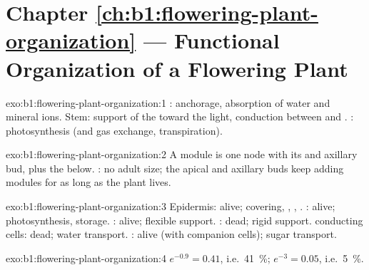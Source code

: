\section*{Chapter \ref{ch:b1:flowering-plant-organization} --- Functional Organization of a Flowering Plant}

\begin{solution}{exo:b1:flowering-plant-organization:1}
: anchorage, absorption of water and mineral ions. Stem: support
of the  toward the light, conduction between  and .
: photosynthesis (and gas exchange, transpiration).
\end{solution}

\begin{solution}{exo:b1:flowering-plant-organization:2}
A module is one node with its  and axillary bud, plus the 
below. : no adult size; the apical and axillary buds
keep adding modules for as long as the plant lives.
\end{solution}

\begin{solution}{exo:b1:flowering-plant-organization:3}
Epidermis: alive; covering, , , . :
alive; photosynthesis, storage. : alive; flexible support.
: dead; rigid support.  conducting cells: dead; water
transport.  : alive (with companion cells); sugar
transport.
\end{solution}

\begin{solution}{exo:b1:flowering-plant-organization:4}
$e^{-0.9} = 0.41$, i.e.\ \qty{41}{\%}; $e^{-3} = 0.05$, i.e.\
\qty{5}{\%}.
\end{solution}

